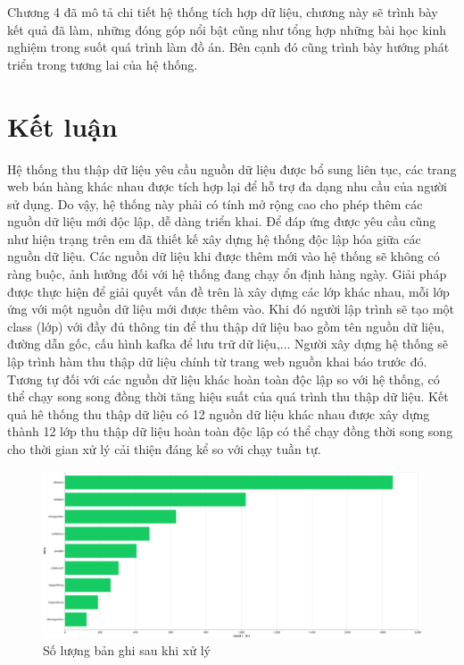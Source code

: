 \documentclass[../DoAn.tex]{subfiles}
\begin{document}
Chương 4 đã mô tả chi tiết hệ thống tích hợp dữ liệu, chương này sẽ trình bày kết quả đã làm, những đóng góp nổi bật cũng như tổng hợp những bài học kinh nghiệm trong suốt quá trình làm đồ án. Bên cạnh đó cũng trình bày hướng phát triển trong tương lai của hệ thống.

\section{Kết luận}
Hệ thống thu thập dữ liệu yêu cầu nguồn dữ liệu được bổ sung liên tục, các trang web bán hàng khác nhau được tích hợp lại để hỗ trợ đa dạng nhu cầu của người sử dụng. Do vậy, hệ thống này phải có tính mở rộng cao cho phép thêm các nguồn dữ liệu mới độc lập, dễ dàng triển khai. Để đáp ứng được yêu cầu cũng như hiện trạng trên em đã thiết kế xây dựng hệ thống độc lập hóa giữa các nguồn dữ liệu. Các nguồn dữ liệu khi được thêm mới vào hệ thống sẽ không có ràng buộc, ảnh hưởng đối với hệ thống đang chạy ổn định hàng ngày. Giải pháp được thực hiện để giải quyết vấn đề trên là xây dựng các lớp khác nhau, mỗi lớp ứng với một nguồn dữ liệu mới được thêm vào. Khi đó người lập trình sẽ tạo một class (lớp) với đầy đủ thông tin để thu thập dữ liệu bao gồm tên nguồn dữ liệu, đường dẫn gốc, cấu hình kafka để lưu trữ dữ liệu,... Người xây dựng hệ thống sẽ lập trình hàm thu thập dữ liệu chính từ trang web nguồn khai báo trước đó. Tương tự đối với các nguồn dữ liệu khác hoàn toàn độc lập so với hệ thống, có thể chạy song song đồng thời tăng hiệu suất của quá trình thu thập dữ liệu. Kết quả hê thống thu thập dữ liệu có 12 nguồn dữ liệu khác nhau được xây dựng thành 12 lớp thu thập dữ liệu hoàn toàn độc lập có thể chạy đồng thời song song cho thời gian xử lý cải thiện đáng kể so với chạy tuần tự.

\begin{figure}[H]
    \centering
    \includegraphics[scale=0.25]{Hinhve/total_items.png}
    \caption{Số lượng bản ghi sau khi xử lý}
    \label{fig:my_label2}
\end{figure}
\end{document}
